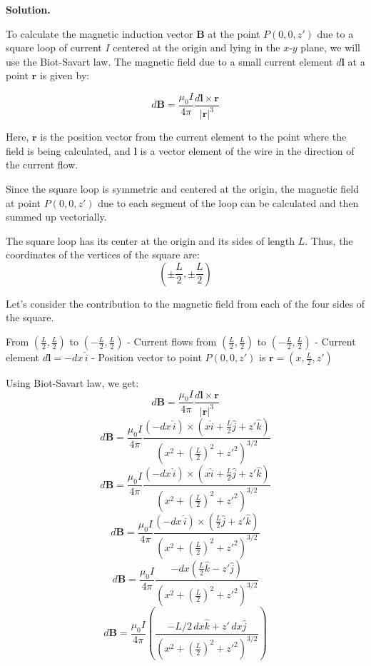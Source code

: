 \documentclass[12pt, a4paper, oneside]{report}
\newenvironment{solution}{
  \par\medskip\noindent
  \textbf{Solution.}\quad\itshape
  \par\noindent\makebox[\linewidth]{\rule{\textwidth}{0.4pt}}
}{
  \par\noindent\makebox[\linewidth]{\rule{\textwidth}{0.4pt}}
  \par\medskip
}
\begin{document}
\begin{solution}

To calculate the magnetic induction vector \(\mathbf{B}\) at the point \(P(0,0,z')\) due to a square loop of current \(I\) centered at the origin and lying in the \(x\)-\(y\) plane, we will use the Biot-Savart law. The magnetic field due to a small current element \(d\mathbf{l}\) at a point \(\mathbf{r}\) is given by:

\[
d\mathbf{B} = \frac{\mu_0 I}{4\pi} \frac{d\mathbf{l} \times \mathbf{r}}{|\mathbf{r}|^3}
\]

Here, \(\mathbf{r}\) is the position vector from the current element to the point where the field is being calculated, and \(\mathbf{l}\) is a vector element of the wire in the direction of the current flow.

Since the square loop is symmetric and centered at the origin, the magnetic field at point \(P(0,0,z')\) due to each segment of the loop can be calculated and then summed up vectorially.

The square loop has its center at the origin and its sides of length \(L\). Thus, the coordinates of the vertices of the square are:
\[
\left(\pm \frac{L}{2}, \pm \frac{L}{2}\right)
\]

Let's consider the contribution to the magnetic field from each of the four sides of the square.

From \(\left(\frac{L}{2}, \frac{L}{2}\right)\) to \(\left(-\frac{L}{2}, \frac{L}{2}\right)\)
- Current flows from \(\left(\frac{L}{2}, \frac{L}{2}\right)\) to \(\left(-\frac{L}{2}, \frac{L}{2}\right)\)
- Current element \(d\mathbf{l} = -dx \, \hat{i}\)
- Position vector to point \(P(0,0,z')\) is \(\mathbf{r} = (x, \frac{L}{2}, z')\)

Using Biot-Savart law, we get:
\[
d\mathbf{B} = \frac{\mu_0 I}{4\pi} \frac{d\mathbf{l} \times \mathbf{r}}{|\mathbf{r}|^3}
\]
\[
d\mathbf{B} = \frac{\mu_0 I}{4\pi} \frac{(-dx \, \hat{i}) \times (x \hat{i} + \frac{L}{2} \hat{j} + z' \hat{k})}{(x^2 + (\frac{L}{2})^2 + z'^2)^{3/2}}
\]
\[
d\mathbf{B} = \frac{\mu_0 I}{4\pi} \frac{(-dx \, \hat{i}) \times (x \hat{i} + \frac{L}{2} \hat{j} + z' \hat{k})}{(x^2 + (\frac{L}{2})^2 + z'^2)^{3/2}}
\]
\[
d\mathbf{B} = \frac{\mu_0 I}{4\pi} \frac{(-dx \, \hat{i}) \times (\frac{L}{2} \hat{j} + z' \hat{k})}{(x^2 + (\frac{L}{2})^2 + z'^2)^{3/2}}
\]
\[
d\mathbf{B} = \frac{\mu_0 I}{4\pi} \frac{-dx \left( \frac{L}{2} \hat{k} - z' \hat{j} \right)}{(x^2 + (\frac{L}{2})^2 + z'^2)^{3/2}}
\]
\[
d\mathbf{B} = \frac{\mu_0 I}{4\pi} \left( \frac{-L/2 \, dx \hat{k} + z' \, dx \hat{j}}{(x^2 + (\frac{L}{2})^2 + z'^2)^{3/2}} \right)
\]


\end{solution}
\end{document}
